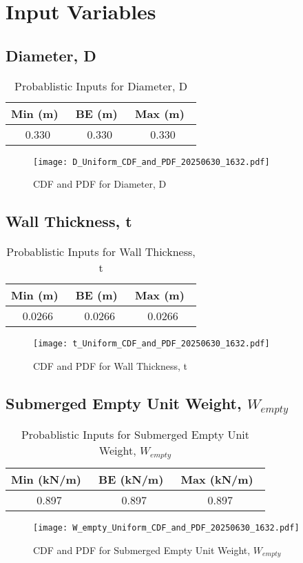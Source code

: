 \documentclass{article}
\begin{document}
\section*{Input Variables}

\subsection*{Diameter, D}
\begin{table}[h!]
\centering
\caption{Probablistic Inputs for Diameter, D}
\begin{tabular}{|c|c|c|}
\hline
Min (m)\ & BE (m)\ & Max (m)\ \\
\hline
0.330 & 0.330 & 0.330 \\
\hline
\end{tabular}
\end{table}
\begin{figure}[h!]
\centering
\texttt{[image: D\_Uniform\_CDF\_and\_PDF\_20250630\_1632.pdf]}
\caption{CDF and PDF for Diameter, D}
\end{figure}
\clearpage
\subsection*{Wall Thickness, t}
\begin{table}[h!]
\centering
\caption{Probablistic Inputs for Wall Thickness, t}
\begin{tabular}{|c|c|c|}
\hline
Min (m)\ & BE (m)\ & Max (m)\ \\
\hline
0.0266 & 0.0266 & 0.0266 \\
\hline
\end{tabular}
\end{table}
\begin{figure}[h!]
\centering
\texttt{[image: t\_Uniform\_CDF\_and\_PDF\_20250630\_1632.pdf]}
\caption{CDF and PDF for Wall Thickness, t}
\end{figure}
\clearpage
\subsection*{Submerged Empty Unit Weight, $W_{empty}$}
\begin{table}[h!]
\centering
\caption{Probablistic Inputs for Submerged Empty Unit Weight, $W_{empty}$}
\begin{tabular}{|c|c|c|}
\hline
Min (kN/m)\ & BE (kN/m)\ & Max (kN/m)\ \\
\hline
0.897 & 0.897 & 0.897 \\
\hline
\end{tabular}
\end{table}
\begin{figure}[h!]
\centering
\texttt{[image: W\_empty\_Uniform\_CDF\_and\_PDF\_20250630\_1632.pdf]}
\caption{CDF and PDF for Submerged Empty Unit Weight, $W_{empty}$}
\end{figure}
\clearpage
\end{document}
